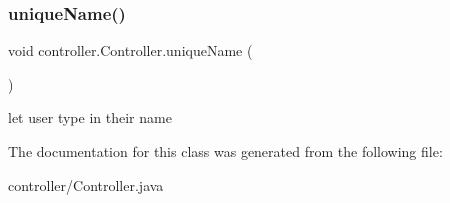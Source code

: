 \subsubsection{\texorpdfstring{unique\+Name()}{uniqueName()}}
{\footnotesize\ttfamily void controller.\+Controller.\+unique\+Name (\begin{DoxyParamCaption}{ }\end{DoxyParamCaption})\hspace{0.3cm}{\ttfamily [inline]}}

let user type in their name 

The documentation for this class was generated from the following file\+:\begin{DoxyCompactItemize}
\item 
controller/Controller.\+java\end{DoxyCompactItemize}
